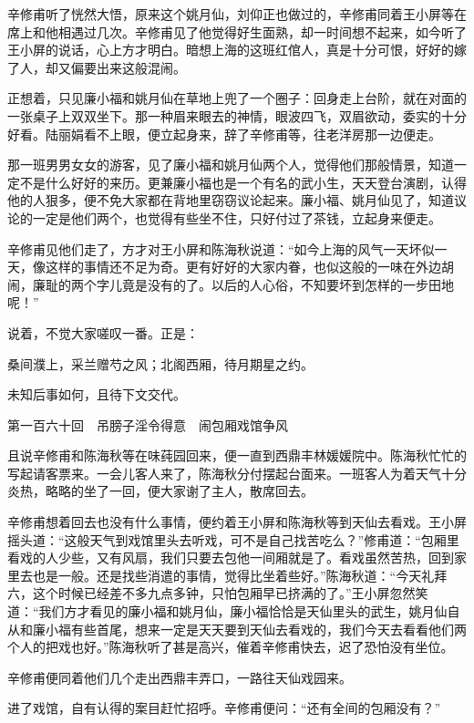 \documentclass[12pt,UTF8]{ctexbook}
\begin{document}
{{{辛修甫听了恍然大悟，原来这个姚月仙，刘仰正也做过的，辛修甫同着王小屏等在席上和他相遇过几次。辛修甫见了他觉得好生面熟，却一时间想不起来，如今听了王小屏的说话，心上方才明白。暗想上海的这班红倌人，真是十分可恨，好好的嫁了人，却又偏要出来这般混闹。

正想着，只见廉小福和姚月仙在草地上兜了一个圈子：回身走上台阶，就在对面的一张桌子上双双坐下。那一种眉来眼去的神情，眼波四飞，双眉欲动，委实的十分好看。陆丽娟看不上眼，便立起身来，辞了辛修甫等，往老洋房那一边便走。

那一班男男女女的游客，见了廉小福和姚月仙两个人，觉得他们那般情景，知道一定不是什么好好的来历。更兼廉小福也是一个有名的武小生，天天登台演剧，认得他的人狠多，便不免大家都在背地里窃窃议论起来。廉小福、姚月仙见了，知道议论的一定是他们两个，也觉得有些坐不住，只好付过了茶钱，立起身来便走。

辛修甫见他们走了，方才对王小屏和陈海秋说道：“如今上海的风气一天坏似一天，像这样的事情还不足为奇。更有好好的大家内眷，也似这般的一味在外边胡闹，廉耻的两个字儿竟是没有的了。以后的人心俗，不知要坏到怎样的一步田地呢！”

说着，不觉大家嗟叹一番。正是：

桑间濮上，采兰赠芍之风；北阁西厢，待月期星之约。

未知后事如何，且待下文交代。





第一百六十回　吊膀子淫令得意　闹包厢戏馆争风





且说辛修甫和陈海秋等在味莼园回来，便一直到西鼎丰林媛媛院中。陈海秋忙忙的写起请客票来。一会儿客人来了，陈海秋分付摆起台面来。一班客人为着天气十分炎热，略略的坐了一回，便大家谢了主人，散席回去。

辛修甫想着回去也没有什么事情，便约着王小屏和陈海秋等到天仙去看戏。王小屏摇头道：“这般天气到戏馆里头去听戏，可不是自己找苦吃么？”修甫道：“包厢里看戏的人少些，又有风扇，我们只要去包他一间厢就是了。看戏虽然苦热，回到家里去也是一般。还是找些消遣的事情，觉得比坐着些好。”陈海秋道：“今天礼拜六，这个时候已经差不多九点多钟，只怕包厢早已挤满的了。”王小屏忽然笑道：“我们方才看见的廉小福和姚月仙，廉小福恰恰是天仙里头的武生，姚月仙自从和廉小福有些首尾，想来一定是天天要到天仙去看戏的，我们今天去看看他们两个人的把戏也好。”陈海秋听了甚是高兴，催着辛修甫快去，迟了恐怕没有坐位。

辛修甫便同着他们几个走出西鼎丰弄口，一路往天仙戏园来。

进了戏馆，自有认得的案目赶忙招呼。辛修甫便问：“还有全间的包厢没有？”

}}}
\end{document}
